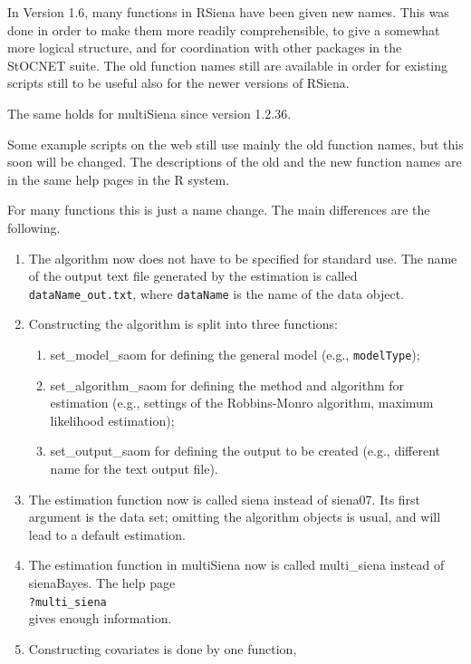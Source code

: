 \documentclass[a4paper,fleqn,11pt]{article}
\newcommand{\+}{\, + \,}
\newcommand{\sfn}[1]{\textsf{#1}}
\newcommand{\rs}{{\sf RSiena}}
\newcommand{\RS}{{\sf \textsf{RSiena} }}
\newcommand{\SN}{{\sf StOCNET }}
\newcommand{\MS}{{\sf multiSiena }}
\begin{document}
In Version 1.6, many functions in \RS have been given new names.
This was done in order to make them more readily comprehensible,
to give a somewhat more logical structure, and
for coordination with other packages in the \SN suite.
The old function names still are available in order
for existing scripts still to be useful also for the newer versions of \rs.

The same holds for \MS since version 1.2.36.

Some example scripts on the web
still use mainly the old function names,
but this soon will be changed.
The descriptions of the old and the new function names
are in the same help pages in the R system.
\medskip

For many functions this is just a name change.
The main differences are the following.
\begin{enumerate}
  \item The algorithm now does not have to be specified for
        standard use. The name of the output text file generated
        by the estimation is called \texttt{dataName\_out.txt},
        where \texttt{dataName} is the name of the data object.
  \item Constructing the algorithm is split into three functions:
        \begin{enumerate}
        \item \sfn{set\_model\_saom} for defining the general model
             (e.g., \texttt{modelType});
        \item \sfn{set\_algorithm\_saom} for defining the
              method and algorithm for estimation (e.g., settings of the
              Robbins-Monro algorithm, maximum likelihood estimation);
        \item \sfn{set\_output\_saom} for defining the output to be
               created (e.g., different name for the text output file).
        \end{enumerate}
  \item The estimation function now is called \sfn{siena}
        instead of \sfn{siena07}.
        Its first argument is the data set; omitting the algorithm objects
        is usual, and will lead to a default estimation.
  \item The estimation function in \MS now is called \sfn{multi\_siena}
        instead of \sfn{sienaBayes}. The help page\\
        \texttt{?multi\_siena}\\
        gives enough information.
  \item Constructing covariates is done by one function,

\end{enumerate}
\end{document}
